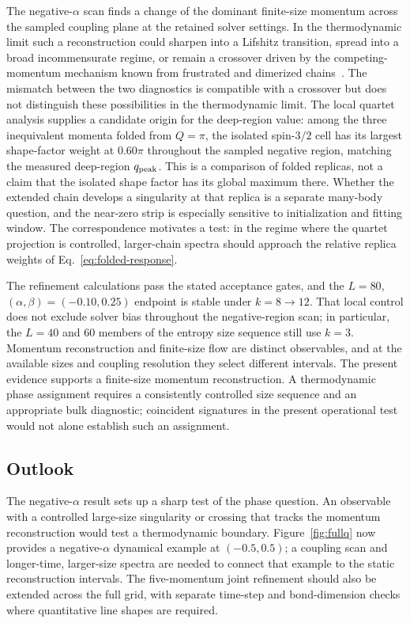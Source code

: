 The negative-$\alpha$ scan finds a change of the dominant finite-size momentum
across the sampled coupling plane at the retained solver settings.
In the thermodynamic limit such a reconstruction could sharpen into a Lifshitz
transition, spread into a broad incommensurate regime, or remain a crossover
driven by the competing-momentum mechanism known from frustrated and dimerized
chains~\cite{hida1992,chitra1995,hakobyan2001,white2008s1}.
The mismatch between the two diagnostics is compatible with a crossover but does
not distinguish these possibilities in the thermodynamic limit.
The local quartet analysis supplies a candidate origin for the deep-region value:
among the three inequivalent momenta folded from $Q=\pi$, the isolated
spin-$3/2$ cell has its largest shape-factor weight at $0.60\pi$ throughout the
sampled negative region, matching the measured deep-region $q_{\mathrm{peak}}$.
This is a comparison of folded replicas, not a claim that the isolated shape
factor has its global maximum there.
Whether the extended chain develops a singularity at that replica is a separate
many-body question, and the near-zero strip is especially sensitive to
initialization and fitting window.
The correspondence motivates a test: in the regime where the quartet projection
is controlled, larger-chain spectra should approach the relative replica weights
of Eq.~\eqref{eq:folded-response}.

The refinement calculations pass the stated acceptance gates, and the
$L=80$, $(\alpha,\beta)=(-0.10,0.25)$ endpoint is stable under
$k=8\rightarrow12$.
That local control does not exclude solver bias throughout the negative-region
scan; in particular, the $L=40$ and 60 members of the entropy size sequence still
use $k=3$.
Momentum reconstruction and finite-size flow are distinct observables, and at the
available sizes and coupling resolution they select different intervals.
The present evidence supports a finite-size momentum reconstruction.
A thermodynamic phase assignment requires a consistently controlled size sequence
and an appropriate bulk diagnostic; coincident signatures in the present
operational test would not alone establish such an assignment.

\subsection{Outlook}
\label{sec:remaining-tests}

The negative-$\alpha$ result sets up a sharp test of the phase question.
An observable with a controlled large-size singularity or crossing that tracks the
momentum reconstruction would test a thermodynamic boundary.
Figure~\ref{fig:fullq} now provides a negative-$\alpha$ dynamical example at
$(-0.5,0.5)$; a coupling scan and longer-time, larger-size spectra are needed to
connect that example to the static reconstruction intervals.
The five-momentum joint refinement should also be extended across the full grid,
with separate time-step and bond-dimension checks where quantitative line shapes
are required.


